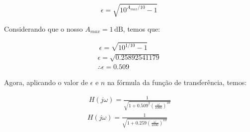 $$
    \epsilon = \sqrt{10^{A_{max}/10}-1}
$$

Considerando que o nosso $A_{max}=1\, \text{dB}$, temos que:

\begin{align} \
    \epsilon = \sqrt{10^{1/10}-1}   \\
    \epsilon = \sqrt{0.25892541179} \\
    \therefore \epsilon = 0.509
\end{align}

Agora, aplicando o valor de $\epsilon$ e $n$ na fórmula da função de transferência, temos:

\begin{align} \
    H(j\omega) = \frac{1}{\sqrt{1 + 0.509^2 \left( \frac{\omega}{1000} \right)^{10}}} \\
    H(j\omega) = \frac{1}{\sqrt{1 + 0.259 \left( \frac{\omega}{1000} \right)^{10}}}
\end{align}

